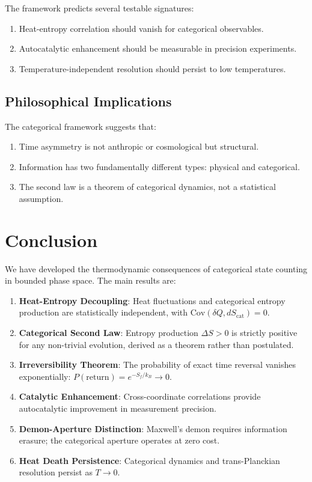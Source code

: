 \documentclass[twocolumn,10pt]{article}
\begin{document}
The framework predicts several testable signatures:

\begin{enumerate}
    \item Heat-entropy correlation should vanish for categorical observables.
    \item Autocatalytic enhancement should be measurable in precision experiments.
    \item Temperature-independent resolution should persist to low temperatures.
\end{enumerate}

\subsection{Philosophical Implications}

The categorical framework suggests that:

\begin{enumerate}
    \item Time asymmetry is not anthropic or cosmological but structural.
    \item Information has two fundamentally different types: physical and categorical.
    \item The second law is a theorem of categorical dynamics, not a statistical assumption.
\end{enumerate}

\section{Conclusion}

We have developed the thermodynamic consequences of categorical state counting in bounded phase space. The main results are:

\begin{enumerate}
    \item \textbf{Heat-Entropy Decoupling}: Heat fluctuations and categorical entropy production are statistically independent, with $\text{Cov}(\delta Q, dS_{\text{cat}}) = 0$.

    \item \textbf{Categorical Second Law}: Entropy production $\Delta S > 0$ is strictly positive for any non-trivial evolution, derived as a theorem rather than postulated.

    \item \textbf{Irreversibility Theorem}: The probability of exact time reversal vanishes exponentially: $P(\text{return}) = e^{-S_f/k_B} \to 0$.

    \item \textbf{Catalytic Enhancement}: Cross-coordinate correlations provide autocatalytic improvement in measurement precision.

    \item \textbf{Demon-Aperture Distinction}: Maxwell's demon requires information erasure; the categorical aperture operates at zero cost.

    \item \textbf{Heat Death Persistence}: Categorical dynamics and trans-Planckian resolution persist as $T \to 0$.
\end{enumerate}
\end{document}
